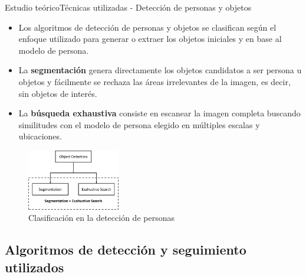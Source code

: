
\begin{frame}{Estudio teórico}{Técnicas utilizadas - Detección de personas y objetos}

\begin{itemize}
    \justifying
    \item Los algoritmos de detección de personas y objetos se clasifican según el enfoque utilizado para generar o extraer los objetos iniciales y en base al modelo de persona.
    \item La \textbf{segmentación} genera directamente los objetos candidatos a ser persona u objetos y fácilmente se rechaza las áreas irrelevantes de la imagen, es decir, sin objetos de interés.
    \item La \textbf{búsqueda exhaustiva} consiste en escanear la imagen completa buscando similitudes con el modelo de persona elegido en múltiples escalas y ubicaciones.
\end{itemize}

\begin{figure}[ht]
\centering
\includegraphics[width=0.36\textwidth]{Images/estudio-teorico/people-detection-classification.png}
\caption{\label{fig:people-detection-classification}Clasificación en la detección de personas}
\end{figure}

\end{frame}


\subsection{Algoritmos de detección y seguimiento utilizados}

